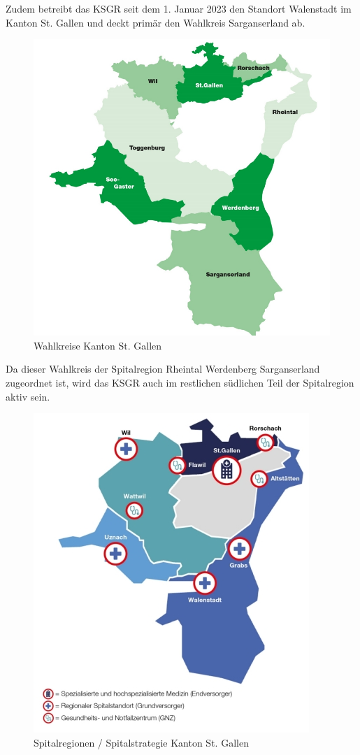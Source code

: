 \begin{flushleft}
    Zudem betreibt das KSGR seit dem 1. Januar 2023 den Standort Walenstadt im Kanton St. Gallen und deckt primär den Wahlkreis Sarganserland ab.
    \begin{figure}[H]
        \centering
        \includegraphics[width=0.65\linewidth]{source/introduction/initial_situation/sg_wahlkreise}
        \caption{Wahlkreise Kanton St. Gallen\cite{LEZ4SPDD}}
        \label{fig:sg_wahlkreise}
    \end{figure}
\end{flushleft}
\begin{flushleft}
    Da dieser Wahlkreis der Spitalregion Rheintal Werdenberg Sarganserland zugeordnet ist, wird das KSGR auch im restlichen südlichen Teil der Spitalregion aktiv sein.
    \begin{figure}[H]
        \centering
        \includegraphics[width=0.5\linewidth]{source/introduction/initial_situation/sg_spitalregionen}
        \caption{Spitalregionen / Spitalstrategie Kanton St. Gallen\cite{3L8EIPUP}}
        \label{fig:sg_spitalregionen}
    \end{figure}
\end{flushleft}
